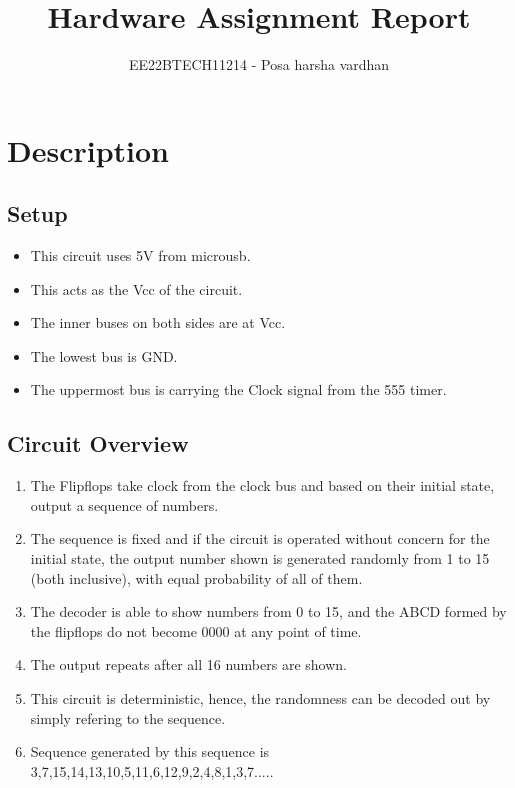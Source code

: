 \documentclass{article}
\begin{document}
\title{Hardware Assignment Report}
\author{EE22BTECH11214 -  Posa harsha vardhan}
\date{}
\maketitle

\maketitle

\section{Description}

\subsection{Setup}
\begin{itemize}
\item This circuit uses 5V from microusb.
\item This acts as the Vcc of the circuit. 
\item The inner buses on both sides are at Vcc. 
\item The lowest bus is GND. 
\item The uppermost bus is carrying the Clock signal from the 555 timer.
\end{itemize}

\subsection{Circuit Overview}
\begin{enumerate}
\item The Flipflops take clock from the clock bus and based on their initial state, output a sequence of numbers.
\item The sequence is fixed and if the circuit is operated without concern for the initial state, the output number shown is generated randomly from 1 to 15 (both inclusive), with equal probability of all of them.
\item The decoder is able to show numbers from 0 to 15, and the ABCD formed by the flipflops do not become 0000 at any point of time.
\item The output repeats after all 16 numbers are shown.
\item This circuit is deterministic, hence, the randomness can be decoded out by simply refering to the sequence. 
\item Sequence generated by this sequence is 3,7,15,14,13,10,5,11,6,12,9,2,4,8,1,3,7.....
\end{enumerate}
\end{document}
